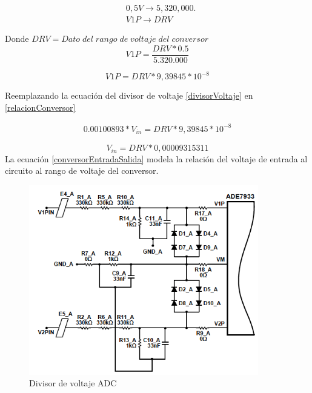         \begin{align*}
            &0,5V \rightarrow 5,320,000.\\
            &V1P \rightarrow DRV
        \end{align*}

        Donde $DRV = Dato\;del\;rango\;de\;voltaje\;del\;conversor$\\

        \begin{equation}
            V1P = \frac{DRV * 0.5}{5.320.000}
        \end{equation}

        \begin{equation}\label{relacionConversor}
            V1P = DRV * 9,39845 * 10^{-8} 
        \end{equation}

        Reemplazando la ecuación del divisor de voltaje \ref{divisorVoltaje} en \ref{relacionConversor}

        \begin{align*}
            0.00100893 * V_{in} = DRV * 9,39845 * 10^{-8} 
        \end{align*}

        \begin{equation}\label{conversorEntradaSalida}
            V_{in} = DRV * 0,00009315311
        \end{equation}
        La ecuación \ref{conversorEntradaSalida} modela la relación del voltaje de entrada al circuito al rango de voltaje del conversor.

        \begin{figure}[H]
            \centering
            \includegraphics[width = 10cm]{3Proyecto/divisorVoltaje}
            \caption{Divisor de voltaje ADC} 
            \label{fig:divisorVolate}
        \end{figure} 

